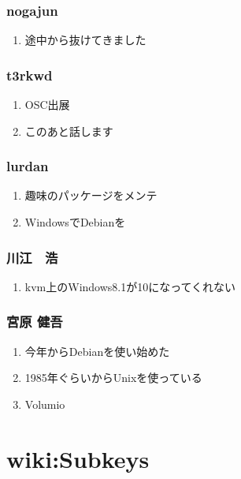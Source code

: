 \documentclass[cjk,dvipdfmx,10pt,compress,%
hyperref={bookmarks=true,bookmarksnumbered=true,bookmarksopen=false,%
colorlinks=false,%
pdftitle={第 101 回 関西 Debian 勉強会},%
pdfauthor={倉敷・のがた・佐々木・かわだ},%
pdfsubject={資料},%
}]{beamer}
\begin{document}
\begin{frame}
  \frametitle{ nogajun }
  \begin{enumerate}
  \item 途中から抜けてきました
  \end{enumerate}
\end{frame}

\begin{frame}
  \frametitle{ t3rkwd }
  \begin{enumerate}
  \item OSC出展
  \item このあと話します
  \end{enumerate}
\end{frame}

\begin{frame}
  \frametitle{ lurdan }
  \begin{enumerate}
  \item 趣味のパッケージをメンテ
  \item WindowsでDebianを
  \end{enumerate}
\end{frame}

\begin{frame}
  \frametitle{ 川江　浩 }
  \begin{enumerate}
  \item kvm上のWindows8.1が10になってくれない
  \end{enumerate}
\end{frame}

\begin{frame}
  \frametitle{ 宮原 健吾 }
  \begin{enumerate}
  \item 今年からDebianを使い始めた
  \item 1985年ぐらいからUnixを使っている
  \item Volumio
  \end{enumerate}
\end{frame}


\section{wiki:Subkeys}

\end{document}
